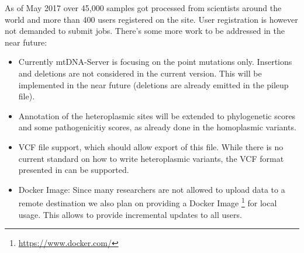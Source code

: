 As of May 2017 over 45,000 samples got processed from scientists around the world and more than 400 users registered on the site. User registration is however not demanded to submit jobs. There's some more work to be addressed in the near future:
\begin{itemize}
\item Currently mtDNA-Server is focusing on the point mutations only. Insertions and deletions are not considered in the current version. This will be implemented in the near future (deletions are already emitted in the pileup file).
\item Annotation of the heteroplasmic sites will be extended to phylogenetic scores and some pathogenicitiy scores, as already done in the homoplasmic variants. 
\item VCF file support, which should allow export of this file. While there is no current standard on how to write heteroplasmic variants, the VCF format presented in \cite{Calabrese2014} can be supported.
\item Docker Image: Since many researchers are not allowed to upload data to a remote destination we also plan on providing a Docker Image \footnote{\url{https://www.docker.com/}} for local usage. This allows to provide incremental updates to all users.  
\end{itemize}








